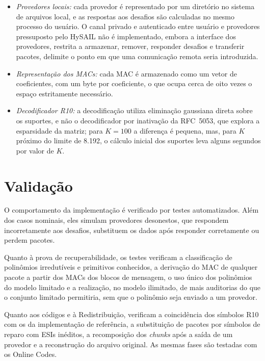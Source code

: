 \begin{itemize}
	\item \textit{Provedores locais:} cada provedor é representado por um diretório no sistema de arquivos local, e as respostas aos desafios são calculadas no mesmo processo do usuário. O canal privado e autenticado entre usuário e provedores pressuposto pelo HySAIL \cite{amaral2019hysail} não é implementado, embora a interface dos provedores, restrita a armazenar, remover, responder desafios e transferir pacotes, delimite o ponto em que uma comunicação remota seria introduzida.
	\item \textit{Representação dos MACs:} cada \acrshort{MAC} é armazenado como um vetor de coeficientes, com um byte por coeficiente, o que ocupa cerca de oito vezes o espaço estritamente necessário.
	\item \textit{Decodificador R10:} a decodificação utiliza eliminação gaussiana direta sobre os suportes, e não o decodificador por inativação da RFC~5053, que explora a esparsidade da matriz; para $K = 100$ a diferença é pequena, mas, para $K$ próximo do limite de 8.192, o cálculo inicial dos suportes leva alguns segundos por valor de $K$.
\end{itemize}

\section{Validação}

O comportamento da implementação é verificado por testes automatizados. Além dos casos nominais, eles simulam provedores desonestos, que respondem incorretamente aos desafios, substituem os dados após responder corretamente ou perdem pacotes.

Quanto à prova de recuperabilidade, os testes verificam a classificação de polinômios irredutíveis e primitivos conhecidos, a derivação do \acrshort{MAC} de qualquer pacote a partir dos \acrshort{MAC}s dos blocos de mensagem, o uso único dos polinômios do modelo limitado e a realização, no modelo ilimitado, de mais auditorias do que o conjunto limitado permitiria, sem que o polinômio seja enviado a um provedor.

Quanto aos códigos e à Redistribuição, verificam a coincidência dos símbolos R10 com os da implementação de referência, a substituição de pacotes por símbolos de reparo com \acrshort{ESI}s inéditos, a recomposição dos \emph{chunks} após a saída de um provedor e a reconstrução do arquivo original. As mesmas fases são testadas com os Online Codes.